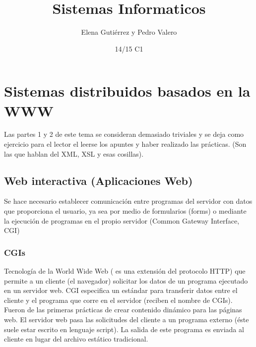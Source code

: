 \documentclass{apuntes}
\title{Sistemas Informaticos}
\author{Elena Gutiérrez y Pedro Valero}
\date{14/15 C1}
\begin{document}
\pagestyle{plain}
\maketitle

\tableofcontents
\newpage
\setcounter{chapter}{1}
\chapter{Sistemas distribuidos basados en la WWW}

Las partes 1 y 2 de este tema se consideran demasiado triviales y se deja como ejercicio para el lector el leerse los apuntes y haber realizado las prácticas. (Son las que hablan del XML, XSL y esas cosillas).

\setcounter{section}{2}
\section{Web interactiva (Aplicaciones Web)}
Se hace necesario establecer comunicación entre programas del servidor con datos que proporciona el usuario, ya sea por medio de formularios (forms) o mediante la ejecución de programas en el propio servidor (Common Gateway Interface, CGI)

\subsection{CGIs}
Tecnología de la World Wide Web ( es una extensión del protocolo HTTP) que permite a un cliente (el navegador) solicitar los datos de un programa ejecutado en un servidor web. CGI especifica un estándar para transferir datos entre el cliente y el programa que corre en el servidor (reciben el nombre de CGIs). Fueron de las primeras prácticas de crear contenido dinámico para las páginas web. El servidor web pasa las solicitudes del cliente a un programa externo (éste suele estar escrito en lenguaje script). La salida de este programa es enviada al cliente en lugar del archivo estático tradicional.
\end{document}
